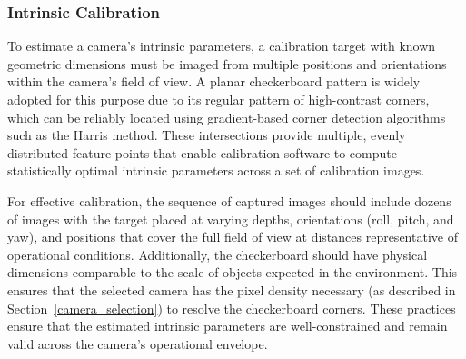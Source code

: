 \documentclass{erauthesis}
\begin{document}
\subsubsection{Intrinsic Calibration} \label{intrinsic_calib}

To estimate a camera's intrinsic parameters, a calibration target with known geometric dimensions must be imaged from multiple positions and orientations within the camera’s field of view.  
A planar checkerboard pattern is widely adopted for this purpose due to its regular pattern of high-contrast corners, which can be reliably located using gradient-based corner detection algorithms such as the Harris method.  
These intersections provide multiple, evenly distributed feature points that enable calibration software to compute statistically optimal intrinsic parameters across a set of calibration images.

For effective calibration, the sequence of captured images should include dozens of images with the target placed at varying depths, orientations (roll, pitch, and yaw), and positions that cover the full field of view at distances representative of operational conditions.
Additionally, the checkerboard should have physical dimensions comparable to the scale of objects expected in the environment. This ensures that the selected camera has the pixel density necessary (as described in Section~\ref{camera_selection}) to resolve the checkerboard corners.
These practices ensure that the estimated intrinsic parameters are well-constrained and remain valid across the camera’s operational envelope.
\end{document}
